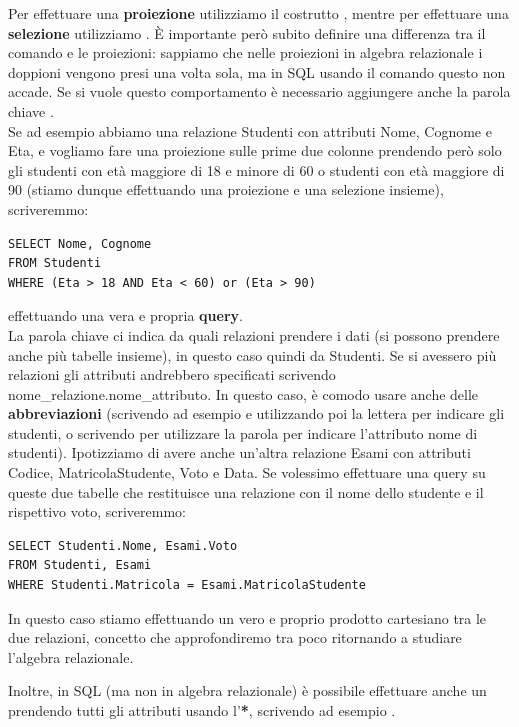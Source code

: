 \documentclass[11pt, a4paper, titlepage, oneside]{scrbook}
\begin{document}
Per effettuare una \textbf{proiezione} utilizziamo il costrutto , mentre per effettuare una \textbf{selezione} utilizziamo . È importante però subito definire una differenza tra il comando  e le proiezioni: sappiamo che nelle proiezioni in algebra relazionale  i doppioni vengono presi una volta sola, ma in SQL usando il comando  questo non accade. Se si vuole questo comportamento è necessario aggiungere anche la parola chiave .\\
Se ad esempio abbiamo una relazione Studenti con attributi Nome, Cognome e Eta, e vogliamo fare una proiezione sulle prime due colonne prendendo però solo gli studenti con età maggiore di 18 e minore di 60 o studenti con età maggiore di 90 (stiamo dunque effettuando una proiezione e una selezione insieme), scriveremmo:

\begin{lstlisting}
SELECT Nome, Cognome 
FROM Studenti
WHERE (Eta > 18 AND Eta < 60) or (Eta > 90)
\end{lstlisting}

effettuando una vera e propria \textbf{query}. \\
La parola chiave  ci indica da quali relazioni prendere i dati (si possono prendere anche più tabelle insieme), in questo caso quindi da Studenti. Se si avessero più relazioni gli attributi andrebbero specificati scrivendo nome\_relazione.nome\_attributo. In questo caso, è comodo usare anche delle \textbf{abbreviazioni} (scrivendo ad esempio  e utilizzando poi la lettera  per indicare gli studenti, o scrivendo  per utilizzare la parola  per indicare l'attributo nome di studenti). Ipotizziamo di avere anche un'altra relazione Esami con attributi Codice, MatricolaStudente, Voto e Data. Se volessimo effettuare una query su queste due tabelle che restituisce una relazione con il nome dello studente e il rispettivo voto, scriveremmo:

\begin{lstlisting}
SELECT Studenti.Nome, Esami.Voto 
FROM Studenti, Esami
WHERE Studenti.Matricola = Esami.MatricolaStudente
\end{lstlisting}

\NB In questo caso stiamo effettuando un vero e proprio prodotto cartesiano tra le due relazioni, concetto che approfondiremo tra poco ritornando a studiare l'algebra relazionale.

Inoltre, in SQL (ma non in algebra relazionale) è possibile effettuare anche un  prendendo tutti gli attributi usando l'\textbf{*}, scrivendo ad esempio . 
\end{document}
